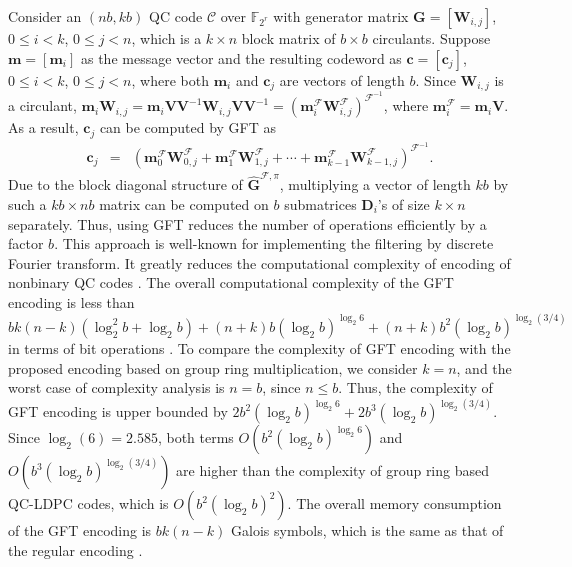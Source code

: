 \documentclass[journal,draftclsnofoot,onecolumn,12pt,twoside]{IEEEtran}
\begin{document}
\textcolor{mycolor}{Consider an $(nb, kb)$ QC code $\mathcal{C}$ over $\mathbb{F}_{2^r}$ with generator matrix $\mathbf{G} = \left[\mathbf{W}_{i,j} \right]$, $0 \leq i < k$, $0 \leq j < n$, which is a $k\times n$ block matrix of $b\times b$ circulants. Suppose $\mathbf{m} = \left[\mathbf{m}_i\right]$ as the message vector and the resulting codeword as $\mathbf{c} =
\left[ \mathbf{c}_j \right]$, $0 \leq i < k$, $0 \leq j < n$, where both $\mathbf{m}_i$ and $\mathbf{c}_j$ are vectors
of length $b$. Since $\mathbf{W}_{i,j}$ is a circulant, $\mathbf{m}_i\mathbf{W}_{i,j}=\mathbf{m}_i\mathbf{V}\mathbf{V}^{-1}\mathbf{W}_{i,j}\mathbf{V}\mathbf{V}^{-1}=\left(\mathbf{m}_i^{\mathcal{F}}\mathbf{W}_{i,j}^{\mathcal{F}}\right)^{\mathcal{F}^{-1}}$, where $\mathbf{m}_i^{\mathcal{F}}=\mathbf{m}_i\mathbf{V}$.
As a result, $\mathbf{c}_j$ can be computed by GFT as \cite{FFT_encoding}
\begin{eqnarray*}
  \mathbf{c}_j &=& \left(\mathbf{m}_0^{\mathcal{F}}\mathbf{W}_{0,j}^{\mathcal{F}}+\mathbf{m}_1^{\mathcal{F}} \mathbf{W}_{1,j}^{\mathcal{F}}+\cdots + \mathbf{m}_{k-1}^{\mathcal{F}}\mathbf{W}_{k-1,j}^{\mathcal{F}}\right)^{\mathcal{F}^{-1}}.
\end{eqnarray*}
Due to the block diagonal structure of $\hat{\mathbf{G}}^{\mathcal{F},\pi}$, multiplying
a vector of length $kb$ by such a $kb\times nb$ matrix can be computed on $b$ submatrices $\mathbf{D}_i$'s of size $k\times n$ separately. Thus, using GFT reduces the number of operations efficiently by a factor $b$. This approach is well-known for  implementing the filtering by discrete Fourier transform. It greatly reduces the computational complexity of encoding of nonbinary QC codes \cite{FFT_encoding}. The overall computational complexity of the
GFT encoding is less than  $bk(n-k)(\log_2^2 b+ \log_2 b)+(n+k)b (\log_2b)^{\log_2 6}+(n+k)b^2(\log_2 b)^{\log_2(3/4)}$
in terms of bit operations \cite{FFT_encoding}. To compare the complexity of GFT encoding with the proposed encoding based on group ring multiplication, we consider $k=n$, and the worst case of complexity analysis is $n=b$, since $n\leq b$.
Thus, the complexity of GFT encoding is upper bounded by $2b^2(\log_2b)^{\log_2 6}+2b^3(\log_2 b)^{\log_2(3/4)}$. Since $\log_2(6)=2.585$, both terms $O(b^2(\log_2b)^{\log_2 6})$ and $O(b^3(\log_2 b)^{\log_2(3/4)})$ are higher than the complexity of group ring based QC-LDPC codes, which is $O(b^2(\log_2 b)^2)$. The overall memory consumption of the GFT encoding
is $bk(n - k)$ Galois symbols, which is the same as that of the regular encoding \cite{FFT_encoding}.}
\end{document}

